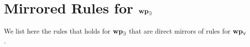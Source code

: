 \section{Mirrored Rules for $\mathbf{wp}_{\exists}$}
\label{sec:mirrored-rules}

We list here the rules that holds for $\mathbf{wp}_{\exists}$ that are direct mirrors of rules for $\mathbf{wp}_{\forall}$.

\begin{proofrules}
    
    \label{rule:wpE-cons}
    
    
    \label{rule:wpE-frame}
    
    
    \label{rule:wpE-subst}
    
    
    \label{rule:wpE-idx}
    
    
    \label{rule:wpE-seq}
    
    
    \label{rule:wpE-assign}
    
    
    \label{rule:wpE-if}
    
    
    \label{rule:wpE-nest}
    
    
    \label{rule:wpE-idx-pass}
    
    
    \label{rule:wpE-idx-swap}
    
    
    \label{rule:wpE-idx-post}
\end{proofrules}